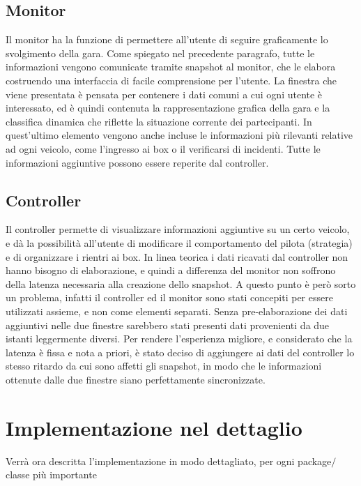 \subsection{Monitor}

Il monitor ha la funzione di permettere all’utente di seguire graficamente lo svolgimento della gara. Come spiegato nel precedente paragrafo, tutte le informazioni vengono comunicate tramite snapshot al monitor, che le elabora costruendo una interfaccia di facile comprensione per l’utente.
La finestra che viene presentata è pensata per contenere i dati comuni a cui ogni utente è interessato, ed è quindi contenuta la rappresentazione grafica della gara e la classifica dinamica che riflette la situazione corrente dei partecipanti. In quest’ultimo elemento vengono anche incluse le informazioni più rilevanti relative ad ogni veicolo, come l’ingresso ai box o il verificarsi di incidenti.
Tutte le informazioni aggiuntive possono essere reperite dal controller.

\subsection{Controller}

Il controller permette di visualizzare informazioni aggiuntive su un certo veicolo, e dà la possibilità all’utente di modificare il comportamento del pilota (strategia) e di organizzare i rientri ai box. 
In linea teorica i dati ricavati dal controller non hanno bisogno di elaborazione, e quindi a differenza del monitor non soffrono della latenza necessaria alla creazione dello snapshot.
A questo punto è però sorto un problema, infatti il controller ed il monitor sono stati concepiti per essere utilizzati assieme, e non come elementi separati.  Senza pre-elaborazione dei dati aggiuntivi  nelle due finestre sarebbero stati presenti dati provenienti da due istanti leggermente diversi. Per rendere l’esperienza migliore, e considerato che la latenza è fissa e nota a priori, è stato deciso di aggiungere ai dati del controller lo stesso ritardo da cui sono affetti gli snapshot, in modo che le informazioni ottenute dalle due finestre siano perfettamente sincronizzate.

\section{Implementazione nel dettaglio}

Verrà ora descritta l’implementazione in modo dettagliato, per ogni package$/$classe più importante

